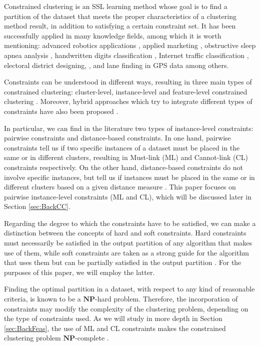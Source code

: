 \documentclass[review]{elsarticle}
\begin{document}
Constrained clustering is an SSL learning method whose goal is to find a partition of the dataset that meets the proper characteristics of a clustering method result, in addition to satisfying a certain constraint set. It has been successfully applied in many knowledge fields, among which it is worth mentioning: advanced robotics applications \cite{davidson2005clustering, semnani2016constrained}, applied marketing \cite{seret2014new}, obstructive sleep apnea analysis \cite{mai2018evolutionary}, handwritten digits classification \cite{li2015scalable}, Internet traffic classification \cite{wang2014internet}, electoral district designing, \cite{brieden2017constrained}, and lane finding in GPS data \cite{wagstaff2001constrained} among others.

Constraints can be understood in different ways, resulting in three main types of constrained clustering: cluster-level, instance-level and feature-level constrained clustering \cite{bradley2000constrained,davidson2007survey,schmidt2011clustering}. Moreover, hybrid approaches which try to integrate different types of constraints have also been proposed \cite{wang2010clustering}. 

In particular, we can find in the literature two types of instance-level constraints: pairwise constraints and distance-based constraints. In one hand, pairwise constraints tell us if two specific instances of a dataset must be placed in the same or in different clusters, resulting in Must-link (ML) and Cannot-link (CL) constraints respectively. On the other hand, distance-based constraints do not involve specific instances, but tell us if instances must be placed in the same or in different clusters based on a given distance measure \cite{davidson2007survey}. This paper focuses on pairwise instance-level constraints (ML and CL), which will be discussed later in Section \ref{sec:BackCC}.

Regarding the degree to which the constraints have to be satisfied, we can make a distinction between the concepts of hard and soft constraints. Hard constraints must necessarily be satisfied in the output partition of any algorithm that makes use of them, while soft constraints are taken as a strong guide for the algorithm that uses them but can be partially satisfied in the output partition \cite{seret2014new, wagstaff2001constrained, law2004clustering}. For the purposes of this paper, we will employ the latter.

Finding the optimal partition in a dataset, with respect to any kind of reasonable criteria, is known to be a $\mathbf{NP}$-hard problem. Therefore, the incorporation of constraints may modify the complexity of the clustering problem, depending on the type of constraints used. As we will study in more depth in Section \ref{sec:BackFeas}, the use of ML and CL constraints makes the constrained clustering problem $\mathbf{NP}$-complete \cite{davidson2005clustering}.
\end{document}
